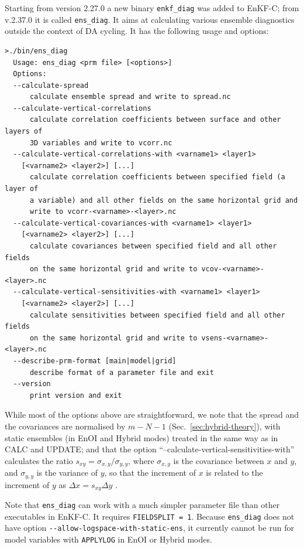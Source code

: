 \documentclass[11pt]{report}
\begin{document}
Starting from version 2.27.0 a new binary \verb|enkf_diag| was added to EnKF-C; from v.2.37.0 it is called \verb|ens_diag|.
It aims at calculating various ensemble diagnostics outside the context of DA cycling.
It has the following usage and options:
\begin{Verbatim}[frame=single,fontsize=\footnotesize]
>./bin/ens_diag
  Usage: ens_diag <prm file> [<options>]
  Options:
  --calculate-spread
      calculate ensemble spread and write to spread.nc
  --calculate-vertical-correlations
      calculate correlation coefficients between surface and other layers of
      3D variables and write to vcorr.nc
  --calculate-vertical-correlations-with <varname1> <layer1>
    [<varname2> <layer2>] [...]
      calculate correlation coefficients between specified field (a layer of
      a variable) and all other fields on the same horizontal grid and
      write to vcorr-<varname>-<layer>.nc
  --calculate-vertical-covariances-with <varname1> <layer1>
    [<varname2> <layer2>] [...]
      calculate covariances between specified field and all other fields
      on the same horizontal grid and write to vcov-<varname>-<layer>.nc
  --calculate-vertical-sensitivities-with <varname1> <layer1>
    [<varname2> <layer2>] [...]
      calculate sensitivities between specified field and all other fields
      on the same horizontal grid and write to vsens-<varname>-<layer>.nc
  --describe-prm-format [main|model|grid]
      describe format of a parameter file and exit
  --version
      print version and exit
\end{Verbatim}
While most of the options above are straightforward, we note that the spread and the covariances are normalised by $m - N - 1$ (Sec.~\ref{sec:hybrid-theory}), with static ensembles (in EnOI and Hybrid modes) treated in the same way as in CALC and UPDATE; and that the option ``--calculate-vertical-sensitivities-with'' calculates the ratio $s_{xy} = \sigma_{x,y} / \sigma_{y,y}$, where $\sigma_{x,y}$ is the covariance between $x$ and $y$, and $\sigma_{y,y}$ is the variance of $y$, so that the increment of $x$ is related to the increment of $y$ as $\Delta x = s_{xy} \Delta y$ \citep[see e.g.][eq.\,5]{and03a}.

Note that \verb|ens_diag| can work with a much simpler parameter file than
other executables in EnKF-C.
It requires \verb|FIELDSPLIT = 1|.
Because \verb|ens_diag| does not have option \verb|--allow-logspace-with-static-ens|, it currently cannot be run for model variables with \verb|APPLYLOG| in EnOI or Hybrid modes.
\end{document}
